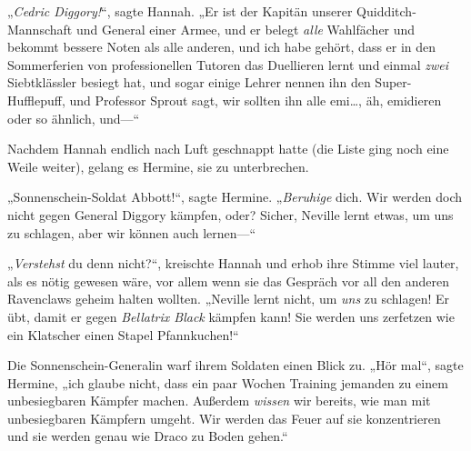 „\emph{Cedric Diggory!}“, sagte Hannah. „Er ist der Kapitän unserer Quidditch-Mannschaft und General einer Armee, und er belegt \emph{alle} Wahlfächer und bekommt bessere Noten als alle anderen, und ich habe gehört, dass er in den Sommerferien von professionellen Tutoren das Duellieren lernt und einmal \emph{zwei} Siebtklässler besiegt hat, und sogar einige Lehrer nennen ihn den Super-Hufflepuff, und Professor Sprout sagt, wir sollten ihn alle emi…, äh, emidieren oder so ähnlich, und—“

Nachdem Hannah endlich nach Luft geschnappt hatte (die Liste ging noch eine Weile weiter), gelang es Hermine, sie zu unterbrechen.

„Sonnenschein-Soldat Abbott!“, sagte Hermine. „\emph{Beruhige} dich. Wir werden doch nicht gegen General Diggory kämpfen, oder? Sicher, Neville lernt etwas, um uns zu schlagen, aber wir können auch lernen—“

„\emph{Verstehst} du denn nicht?“, kreischte Hannah und erhob ihre Stimme viel lauter, als es nötig gewesen wäre, vor allem wenn sie das Gespräch vor all den anderen Ravenclaws geheim halten wollten. „Neville lernt nicht, um \emph{uns} zu schlagen! Er übt, damit er gegen \emph{Bellatrix Black} kämpfen kann! Sie werden uns zerfetzen wie ein Klatscher einen Stapel Pfannkuchen!“

Die Sonnenschein-Generalin warf ihrem Soldaten einen Blick zu. „Hör mal“, sagte Hermine, „ich glaube nicht, dass ein paar Wochen Training jemanden zu einem unbesiegbaren Kämpfer machen. Außerdem \emph{wissen} wir bereits, wie man mit unbesiegbaren Kämpfern umgeht. Wir werden das Feuer auf sie konzentrieren und sie werden genau wie Draco zu Boden gehen.“

